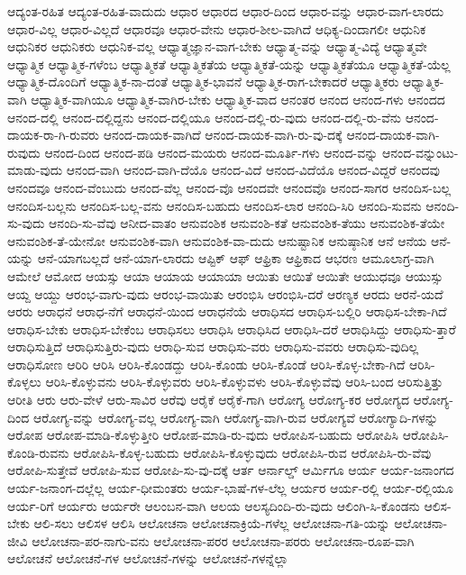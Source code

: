 {ಆದ್ಯಂತ-ರಹಿತ
ಆದ್ಯಂತ-ರಹಿತ-ವಾದುದು
ಆಧಾರ
ಆಧಾರದ
ಆಧಾರ-ದಿಂದ
ಆಧಾರ-ವನ್ನು
ಆಧಾರ-ವಾಗ-ಲಾರದು
ಆಧಾರ-ವಿಲ್ಲ
ಆಧಾರ-ವಿಲ್ಲದೆ
ಆಧಾರವೂ
ಆಧಾರ-ವೇನು
ಆಧಾರ-ಶೀಲ-ವಾಗಿದೆ
ಆಧಿಕ್ಯ-ದಿಂದಾಗಲೀ
ಆಧುನಿಕ
ಆಧುನಿಕರ
ಆಧುನಿಕರು
ಆಧುನಿಕ-ವಲ್ಲ
ಆಧ್ಯಾತ್ಮಜ್ಞಾನ-ವಾಗ-ಬೇಕು
ಆಧ್ಯಾತ್ಮ-ವನ್ನು
ಆಧ್ಯಾತ್ಮ-ವಿದ್ಯೆ
ಆಧ್ಯಾತ್ಮವೇ
ಆಧ್ಯಾತ್ಮಿಕ
ಆಧ್ಯಾತ್ಮಿಕ-ಗಳೆಂಬ
ಆಧ್ಯಾತ್ಮಿಕತೆ
ಆಧ್ಯಾತ್ಮಿಕತೆಯ
ಆಧ್ಯಾತ್ಮಿಕತೆ-ಯನ್ನು
ಆಧ್ಯಾತ್ಮಿಕತೆಯೂ
ಆಧ್ಯಾತ್ಮಿಕತೆ-ಯೆಲ್ಲ
ಆಧ್ಯಾತ್ಮಿಕ-ದೊಂದಿಗೆ
ಆಧ್ಯಾತ್ಮಿಕ-ನಾ-ದಂತೆ
ಆಧ್ಯಾತ್ಮಿಕ-ಭಾವನೆ
ಆಧ್ಯಾತ್ಮಿಕ-ರಾಗ-ಬೇಕಾದರೆ
ಆಧ್ಯಾತ್ಮಿಕರು
ಆಧ್ಯಾತ್ಮಿಕ-ವಾಗಿ
ಆಧ್ಯಾತ್ಮಿಕ-ವಾಗಿಯೂ
ಆಧ್ಯಾತ್ಮಿಕ-ವಾಗಿರ-ಬೇಕು
ಆಧ್ಯಾತ್ಮಿಕ-ವಾದ
ಆನಂತರ
ಆನಂದ
ಆನಂದ-ಗಳು
ಆನಂದದ
ಆನಂದ-ದಲ್ಲಿ
ಆನಂದ-ದಲ್ಲಿದ್ದನು
ಆನಂದ-ದಲ್ಲಿಯೂ
ಆನಂದ-ದಲ್ಲಿ-ರು-ವುದು
ಆನಂದ-ದಲ್ಲಿ-ರು-ವೆನು
ಆನಂದ-ದಾಯಕ-ರಾ-ಗಿ-ರುವರು
ಆನಂದ-ದಾಯಕ-ವಾಗಿದೆ
ಆನಂದ-ದಾಯಕ-ವಾಗಿ-ರು-ವು-ದಕ್ಕೆ
ಆನಂದ-ದಾಯಕ-ವಾಗಿ-ರುವುದು
ಆನಂದ-ದಿಂದ
ಆನಂದ-ಪಡಿ
ಆನಂದ-ಮಯರು
ಆನಂದ-ಮೂರ್ತಿ-ಗಳು
ಆನಂದ-ವನ್ನು
ಆನಂದ-ವನ್ನುಂಟು-ಮಾಡು-ವುದು
ಆನಂದ-ವಾಗಿ
ಆನಂದ-ವಾಗಿ-ದೆಯೊ
ಆನಂದ-ವಿದೆ
ಆನಂದ-ವಿದೆಯೊ
ಆನಂದ-ವಿದ್ದರೆ
ಆನಂದವು
ಆನಂದವೂ
ಆನಂದ-ವೆಂಬುದು
ಆನಂದ-ವೆಲ್ಲ
ಆನಂದ-ವೊ
ಆನಂದವೇ
ಆನಂದವೊ
ಆನಂದ-ಸಾಗರ
ಆನಂದಿಸ-ಬಲ್ಲ
ಆನಂದಿಸ-ಬಲ್ಲನು
ಆನಂದಿಸ-ಬಲ್ಲ-ವನು
ಆನಂದಿಸ-ಬಹುದು
ಆನಂದಿಸ-ಲಾರ
ಆನಂದಿ-ಸಿರಿ
ಆನಂದಿ-ಸುವನು
ಆನಂದಿ-ಸು-ವುದು
ಆನಂದಿ-ಸು-ವೆವು
ಆನೀದ-ವಾತಂ
ಆನುವಂಶಿಕ
ಆನುವಂಶಿ-ಕತೆ
ಆನುವಂಶಿಕ-ತೆಯು
ಆನುವಂಶಿಕ-ತೆಯೇ
ಆನುವಂಶಿಕ-ತೆ-ಯೇನೋ
ಆನುವಂಶಿಕ-ವಾಗಿ
ಆನುವಂಶಿಕ-ವಾ-ದುದು
ಆನುಷ್ಟಾನಿಕ
ಆನುಷ್ಠಾನಿಕ
ಆನೆ
ಆನೆಯ
ಆನೆ-ಯನ್ನು
ಆನೆ-ಯಾಗಬಲ್ಲದೆ
ಆನೆ-ಯಾಗ-ಲಾರದು
ಆಪ್ಟಿಕ್
ಆಫ್
ಆಫ್ರಿಕಾ
ಆಫ್ರಿಕಾದ
ಆಭರಣ
ಆಮೂಲಾಗ್ರ-ವಾಗಿ
ಆಮೇಲೆ
ಆಮೋದ
ಆಯಸ್ಸು
ಆಯಾ
ಆಯಾಯ
ಆಯಾಯಾ
ಆಯಿತು
ಆಯಿತೆ
ಆಯಿತೇ
ಆಯುಧವೂ
ಆಯುಸ್ಸು
ಆಯ್ದ
ಆಯ್ದು
ಆರಂಭ-ವಾಗು-ವುದು
ಆರಂಭ-ವಾಯಿತು
ಆರಂಭಿಸಿ
ಆರಂಭಿಸಿ-ದರೆ
ಆರಣ್ಯಕ
ಆರದು
ಆರನೆ-ಯದೆ
ಆರರು
ಆರಾಧನೆ
ಆರಾಧ-ನೆಗೆ
ಆರಾಧನೆ-ಯಿಂದ
ಆರಾಧನೆಯೆ
ಆರಾಧಿಸದ
ಆರಾಧಿಸ-ಬಲ್ಲಿರಿ
ಆರಾಧಿಸ-ಬೇಕಾ-ಗಿದೆ
ಆರಾಧಿಸ-ಬೇಕು
ಆರಾಧಿಸ-ಬೇಕೆಂಬ
ಆರಾಧಿಸಲು
ಆರಾಧಿಸಿ
ಆರಾಧಿಸಿದ
ಆರಾಧಿಸಿ-ದರೆ
ಆರಾಧಿಸಿದ್ದು
ಆರಾಧಿಸು-ತ್ತಾರೆ
ಆರಾಧಿಸುತ್ತಿದೆ
ಆರಾಧಿಸುತ್ತಿರು-ವುದು
ಆರಾಧಿ-ಸುವ
ಆರಾಧಿಸು-ವರು
ಆರಾಧಿಸು-ವವರು
ಆರಾಧಿಸು-ವುದಿಲ್ಲ
ಆರಾಧಿಸೋಣ
ಆರಿರಿ
ಆರಿಸಿ
ಆರಿಸಿ-ಕೊಂಡದ್ದು
ಆರಿಸಿ-ಕೊಂಡು
ಆರಿಸಿ-ಕೊಂಡೆ
ಆರಿಸಿ-ಕೊಳ್ಳ-ಬೇಕಾ-ಗಿದೆ
ಆರಿಸಿ-ಕೊಳ್ಳಲು
ಆರಿಸಿ-ಕೊಳ್ಳುವನು
ಆರಿಸಿ-ಕೊಳ್ಳುವರು
ಆರಿಸಿ-ಕೊಳ್ಳುವಳು
ಆರಿಸಿ-ಕೊಳ್ಳುವೆವು
ಆರಿಸಿ-ಬಂದ
ಆರಿಸುತ್ತಿತ್ತು
ಆರೀತಿ
ಆರು
ಆರು-ವೇಳೆ
ಆರು-ಸಾವಿರ
ಆರೆವು
ಆರೈಕೆ
ಆರೈಕೆ-ಗಾಗಿ
ಆರೋಗ್ಯ
ಆರೋಗ್ಯ-ಕರ
ಆರೋಗ್ಯದ
ಆರೋಗ್ಯ-ದಿಂದ
ಆರೋಗ್ಯ-ವನ್ನು
ಆರೋಗ್ಯ-ವಲ್ಲ
ಆರೋಗ್ಯ-ವಾಗಿ
ಆರೋಗ್ಯ-ವಾಗಿ-ರುವ
ಆರೋಗ್ಯವೆ
ಆರೋಗ್ಯಾದಿ-ಗಳನ್ನು
ಆರೋಪ
ಆರೋಪ-ಮಾಡಿ-ಕೊಳ್ಳುತ್ತೀರಿ
ಆರೋಪ-ಮಾಡಿ-ರು-ವುದು
ಆರೋಪಿಸ-ಬಹುದು
ಆರೋಪಿಸಿ
ಆರೋಪಿಸಿ-ಕೊಂಡಿ-ರುವನು
ಆರೋಪಿಸಿ-ಕೊಳ್ಳ-ಬಹುದು
ಆರೋಪಿಸಿ-ಕೊಳ್ಳುವುದು
ಆರೋಪಿಸಿ-ರುವ
ಆರೋಪಿಸಿ-ರು-ವೆವು
ಆರೋಪಿ-ಸುತ್ತೇವೆ
ಆರೋಪಿ-ಸುವ
ಆರೋಪಿ-ಸು-ವು-ದಕ್ಕೆ
ಆರ್ತ
ಆರ್ನಾಲ್ಡ್
ಆರ್ಮಿಗೂ
ಆರ್ಯ
ಆರ್ಯ-ಜನಾಂಗದ
ಆರ್ಯ-ಜನಾಂಗ-ದಲ್ಲೆಲ್ಲ
ಆರ್ಯ-ಧೀಮಂತರು
ಆರ್ಯ-ಭಾಷೆ-ಗಳ-ಲೆಲ್ಲ
ಆರ್ಯರ
ಆರ್ಯ-ರಲ್ಲಿ
ಆರ್ಯ-ರಲ್ಲಿಯೂ
ಆರ್ಯ-ರಿಗೆ
ಆರ್ಯರು
ಆರ್ಯರೇ
ಆಲಂಬನ-ವಾಗಿ
ಆಲಯ
ಆಲಸ್ಯದಿಂದಿ-ರು-ವುದು
ಆಲಿಂಗಿ-ಸಿ-ಕೊಂಡನು
ಆಲಿಸ-ಬೇಕು
ಆಲಿ-ಸಲು
ಆಲಿಸಳ
ಆಲಿಸಿ
ಆಲೋಚನಾ
ಆಲೋಚನಾಕ್ರಿಯೆ-ಗಳೆಲ್ಲ
ಆಲೋಚನಾ-ಗತಿ-ಯನ್ನು
ಆಲೋಚನಾ-ಜೀವಿ
ಆಲೋಚನಾ-ಪರ-ನಾಗು-ವನು
ಆಲೋಚನಾ-ಪರರ
ಆಲೋಚನಾ-ಪರರು
ಆಲೋಚನಾ-ರೂಪ-ವಾಗಿ
ಆಲೋಚನೆ
ಆಲೋಚನೆ-ಗಳ
ಆಲೋಚನೆ-ಗಳನ್ನು
ಆಲೋಚನೆ-ಗಳನ್ನೆಲ್ಲಾ
}
